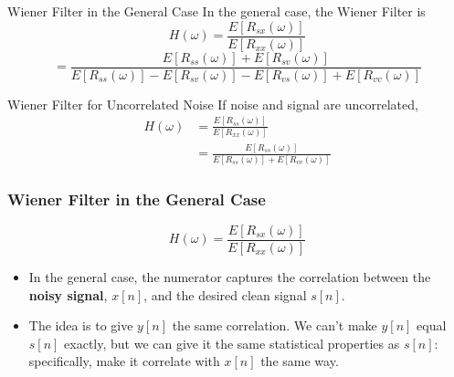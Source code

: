 \documentclass{beamer}
\begin{document}
\begin{frame}
  \begin{block}{Wiener Filter in the General Case}
    In the general case, the Wiener Filter is
    \begin{displaymath}
      H(\omega) =\frac{E\left[R_{sx}(\omega)\right]}{E\left[R_{xx}(\omega)\right]}
    \end{displaymath}
    \begin{displaymath}
      =\frac{E\left[R_{ss}(\omega)\right]+E\left[R_{sv}(\omega)\right]}
      {E\left[R_{ss}(\omega)\right]-E\left[R_{sv}(\omega)\right]-E\left[R_{vs}(\omega)\right]
        +E\left[R_{vv}(\omega)\right]}
    \end{displaymath}
  \end{block}
  \begin{block}{Wiener Filter for Uncorrelated Noise}
    If noise and signal are uncorrelated, 
    \begin{align*}
      H(\omega)
      &=\frac{E\left[R_{ss}(\omega)\right]}{E\left[R_{xx}(\omega)\right]}\\
      &=\frac{E\left[R_{ss}(\omega)\right]}{E\left[R_{ss}(\omega)\right]+E\left[R_{vv}(\omega)\right]}
    \end{align*}
  \end{block}
\end{frame}

\begin{frame}
  \frametitle{Wiener Filter in the General Case}
  \begin{displaymath}
    H(\omega) =\frac{E\left[R_{sx}(\omega)\right]}{E\left[R_{xx}(\omega)\right]}
  \end{displaymath}
  \begin{itemize}
  \item In the general case, the numerator captures the correlation between the {\bf noisy signal},
    $x[n]$, and the desired clean signal $s[n]$.
  \item The idea is to give $y[n]$ the same correlation.  We can't make $y[n]$ equal $s[n]$ exactly,
    but we can give it the same statistical properties  as  $s[n]$: specifically, make
    it correlate with $x[n]$ the same way.
  \end{itemize}
\end{frame}
   
\end{document}
